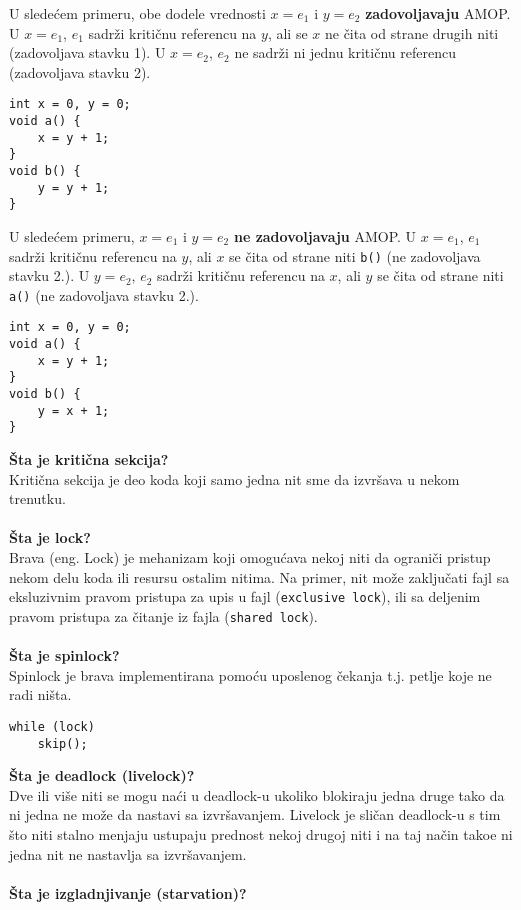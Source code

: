 U slede\'{c}em primeru, obe dodele vrednosti $x=e_1$ i $y=e_2$ \textbf{zadovoljavaju} AMOP. U $x=e_1$, $e_1$ sadr\v{z}i kriti\v{c}nu referencu na $y$, ali se $x$ ne \v{c}ita od strane drugih niti (zadovoljava stavku 1). U $x=e_2$, $e_2$ ne sadr\v{z}i ni jednu kriti\v{c}nu referencu (zadovoljava stavku 2).
\begin{lstlisting}
int x = 0, y = 0;
void a() {
    x = y + 1;
}
void b() {
    y = y + 1;
}
\end{lstlisting}
U slede\'{c}em primeru, $x=e_1$ i $y=e_2$ \textbf{ne zadovoljavaju} AMOP. U $x = e_1$, $e_1$ sadr\v{z}i kriti\v{c}nu referencu na $y$, ali $x$ se \v{c}ita od strane niti \texttt{b()} (ne zadovoljava stavku 2.). U $y = e_2$, $e_2$ sadr\v{z}i kriti\v{c}nu referencu na $x$, ali $y$ se \v{c}ita od strane niti \texttt{a()} (ne zadovoljava stavku 2.).
\begin{lstlisting}
int x = 0, y = 0;
void a() {
    x = y + 1;
}
void b() {
    y = x + 1;
}
\end{lstlisting}
\textbf{\v{S}ta je kriti\v{c}na sekcija?}\\
Kriti\v{c}na sekcija je deo koda koji samo jedna nit sme da izvr\v{s}ava u nekom trenutku. 
\\\\
\textbf{\v{S}ta je lock?}\\
Brava (eng. Lock) je mehanizam koji omogu\'{c}ava nekoj niti da ograni\v{c}i pristup nekom delu koda ili resursu ostalim nitima. Na primer, nit mo\v{z}e zaklju\v{c}ati fajl sa eksluzivnim pravom pristupa za upis u fajl (\texttt{exclusive lock}), ili sa deljenim pravom pristupa  za \v{c}itanje iz fajla (\texttt{shared lock}).
\\\\
\textbf{\v{S}ta je spinlock?}\\
Spinlock je brava implementirana pomo\'{c}u uposlenog \v{c}ekanja t.j. petlje koje ne radi ni\v{s}ta.
\begin{lstlisting}
while (lock)
    skip();
\end{lstlisting}
\textbf{\v{S}ta je deadlock (livelock)?}\\
Dve ili vi\v{s}e niti se mogu na\'{c}i u deadlock-u ukoliko blokiraju jedna druge tako da ni jedna ne mo\v{z}e da nastavi sa izvr\v{s}avanjem. Livelock je sli\v{c}an deadlock-u s tim \v{s}to niti stalno menjaju ustupaju prednost nekoj drugoj niti i na taj na\v{c}in tako\dj{}e ni jedna nit ne nastavlja sa izvr\v{s}avanjem.
\\\\
\textbf{\v{S}ta je izgladnjivanje (starvation)?}\\
